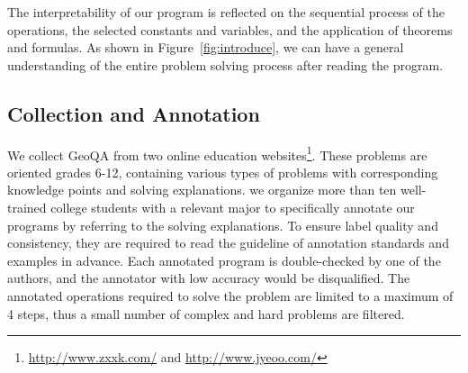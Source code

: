 \documentclass[11pt,a4paper]{article}
\begin{document}
The interpretability of our program is reflected on the sequential process of the operations, the selected constants and variables, and the application of theorems and formulas. As shown in Figure~\ref{fig:introduce}, we can have a general understanding of the entire problem solving process after reading the program.















\begin{table}[tbp]
\centering
{}
\caption{An overview of 18 operations of four different types and 7 constants in the defined program set.
}
\label{table-program}
\end{table}

\subsection{Collection and Annotation}
We collect GeoQA from two online education websites\footnote{\href{http://www.zxxk.com/}{http://www.zxxk.com/} and   \href{http://www.jyeoo.com/}{http://www.jyeoo.com/}}. These problems are oriented grades 6-12, containing various types of problems with corresponding knowledge points and solving explanations. 
we organize more than ten well-trained college students with a relevant major to specifically annotate our programs by referring to the solving explanations. To ensure label quality and consistency, they are required to read the guideline of annotation standards and examples in advance. Each annotated program is double-checked by one of the authors, and the annotator with low accuracy would be disqualified. 
The annotated operations required to solve the problem are limited to a maximum of 4 steps, thus a small number of complex and hard problems are filtered.
\end{document}
